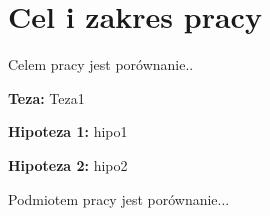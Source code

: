 \section{Cel i zakres pracy}

    Celem pracy jest porównanie..
    
    \textbf{Teza:} Teza1
    
    \textbf{Hipoteza 1:} hipo1
    
    \textbf{Hipoteza 2:} hipo2

    \vspace{0.5cm}
    
    Podmiotem pracy jest porównanie...

    \newpage